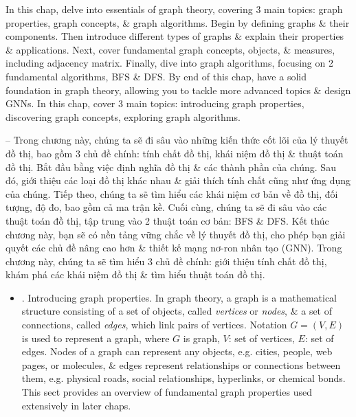 \documentclass{article}
\begin{document}
\begin{itemize}
    In this chap, delve into essentials of graph theory, covering 3 main topics: graph properties, graph concepts, \& graph algorithms. Begin by defining graphs \& their components. Then introduce different types of graphs \& explain their properties \& applications. Next, cover fundamental graph concepts, objects, \& measures, including adjacency matrix. Finally, dive into graph algorithms, focusing on 2 fundamental algorithms, BFS \& DFS. By end of this chap, have a solid foundation in graph theory, allowing you to tackle more advanced topics \& design GNNs. In this chap, cover 3 main topics: introducing graph properties, discovering graph concepts, exploring graph algorithms.

    -- Trong chương này, chúng ta sẽ đi sâu vào những kiến thức cốt lõi của lý thuyết đồ thị, bao gồm 3 chủ đề chính: tính chất đồ thị, khái niệm đồ thị \& thuật toán đồ thị. Bắt đầu bằng việc định nghĩa đồ thị \& các thành phần của chúng. Sau đó, giới thiệu các loại đồ thị khác nhau \& giải thích tính chất cũng như ứng dụng của chúng. Tiếp theo, chúng ta sẽ tìm hiểu các khái niệm cơ bản về đồ thị, đối tượng, độ đo, bao gồm cả ma trận kề. Cuối cùng, chúng ta sẽ đi sâu vào các thuật toán đồ thị, tập trung vào 2 thuật toán cơ bản: BFS \& DFS. Kết thúc chương này, bạn sẽ có nền tảng vững chắc về lý thuyết đồ thị, cho phép bạn giải quyết các chủ đề nâng cao hơn \& thiết kế mạng nơ-ron nhân tạo (GNN). Trong chương này, chúng ta sẽ tìm hiểu 3 chủ đề chính: giới thiệu tính chất đồ thị, khám phá các khái niệm đồ thị \& tìm hiểu thuật toán đồ thị.
    \begin{itemize}
        \item {. Introducing graph properties.} In graph theory, a graph is a mathematical structure consisting of a set of objects, called {\it vertices} or {\it nodes}, \& a set of connections, called {\it edges}, which link pairs of vertices. Notation $G = (V,E)$ is used to represent a graph, where $G$ is graph, $V$: set of vertices, $E$: set of edges. Nodes of a graph can represent any objects, e.g. cities, people, web pages, or molecules, \& edges represent relationships or connections between them, e.g. physical roads, social relationships, hyperlinks, or chemical bonds. This sect provides an overview of fundamental graph properties used extensively in later chaps.


\end{itemize}
\end{itemize}
\end{document}
